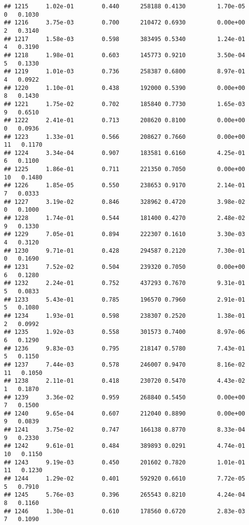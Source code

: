 \documentclass[
]{article}
\begin{document}
\begin{verbatim}
## 1215     1.02e-01        0.440      258188 0.4130         1.70e-05   0   0.1030
## 1216     3.75e-03        0.700      210472 0.6930         0.00e+00   2   0.3140
## 1217     1.58e-03        0.598      383495 0.5340         1.24e-01   4   0.3190
## 1218     1.98e-01        0.603      145773 0.9210         3.50e-04   5   0.1330
## 1219     1.01e-03        0.736      258387 0.6800         8.97e-01   4   0.0922
## 1220     1.10e-01        0.438      192000 0.5390         0.00e+00   8   0.1430
## 1221     1.75e-02        0.702      185840 0.7730         1.65e-03   9   0.6510
## 1222     2.41e-01        0.713      208620 0.8100         0.00e+00   0   0.0936
## 1223     1.33e-01        0.566      208627 0.7660         0.00e+00  11   0.1170
## 1224     3.34e-04        0.907      183581 0.6160         4.25e-01   6   0.1100
## 1225     1.86e-01        0.711      221350 0.7050         0.00e+00  10   0.1480
## 1226     1.85e-05        0.550      238653 0.9170         2.14e-01   7   0.0333
## 1227     3.19e-02        0.846      328962 0.4720         3.98e-02   0   0.1000
## 1228     1.74e-01        0.544      181400 0.4270         2.48e-02   9   0.1330
## 1229     7.05e-01        0.894      222307 0.1610         3.30e-03   4   0.3120
## 1230     9.71e-01        0.428      294587 0.2120         7.30e-01   0   0.1690
## 1231     7.52e-02        0.504      239320 0.7050         0.00e+00   6   0.1280
## 1232     2.24e-01        0.752      437293 0.7670         9.31e-01   5   0.0833
## 1233     5.43e-01        0.785      196570 0.7960         2.91e-01   5   0.1080
## 1234     1.93e-01        0.598      238307 0.2520         1.38e-01   2   0.0992
## 1235     1.92e-03        0.558      301573 0.7400         8.97e-06   6   0.1290
## 1236     9.83e-03        0.795      218147 0.5780         7.43e-01   5   0.1150
## 1237     7.44e-03        0.578      246007 0.9470         8.16e-02  11   0.1050
## 1238     2.11e-01        0.418      230720 0.5470         4.43e-02   1   0.1870
## 1239     3.36e-02        0.959      268840 0.5450         0.00e+00   7   0.1500
## 1240     9.65e-04        0.607      212040 0.8890         0.00e+00   9   0.0839
## 1241     3.75e-02        0.747      166138 0.8770         8.33e-04   9   0.2330
## 1242     9.61e-01        0.484      389893 0.0291         4.74e-01  10   0.1150
## 1243     9.19e-03        0.450      201602 0.7820         1.01e-01  11   0.1230
## 1244     1.29e-02        0.401      592920 0.6610         7.72e-05   5   0.7910
## 1245     5.76e-03        0.396      265543 0.8210         4.24e-04   8   0.1160
## 1246     1.30e-01        0.610      178560 0.6720         2.83e-03   7   0.1090

\end{verbatim}
\end{document}
